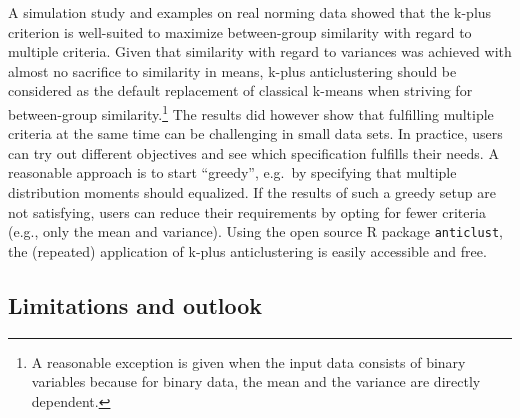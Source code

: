 \documentclass[
  man,floatsintext]{apa7}
\begin{document}
A simulation study and examples on real norming data showed that the k-plus criterion is well-suited to maximize between-group similarity with regard to multiple criteria. Given that similarity with regard to variances was achieved with almost no sacrifice to similarity in means, k-plus anticlustering should be considered as the default replacement of classical k-means when striving for between-group similarity.\footnote{A reasonable exception is given when the input data consists of binary variables because for binary data, the mean and the variance are directly dependent.} The results did however show that fulfilling multiple criteria at the same time can be challenging in small data sets. In practice, users can try out different objectives and see which specification fulfills their needs. A reasonable approach is to start ``greedy'', e.g.~by specifying that multiple distribution moments should equalized. If the results of such a greedy setup are not satisfying, users can reduce their requirements by opting for fewer criteria (e.g., only the mean and variance). Using the open source R package \texttt{anticlust}, the (repeated) application of k-plus anticlustering is easily accessible and free.

\hypertarget{limitations-and-outlook}{%
\subsection{Limitations and outlook}\label{limitations-and-outlook}}
\end{document}
